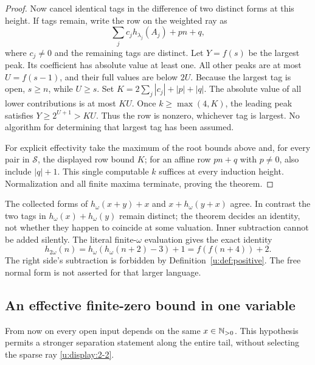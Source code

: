 \begin{proof}
Now cancel identical tags in the difference of two distinct forms at this
height. If tags remain, write the row on the weighted ray as
\begin{equation}
                \sum_j c_j h_{\lambda_j}(A_j)+pn+q,  \label{u:display:2-5}
\end{equation}
where $c_j\ne0$ and the remaining tags are distinct. Let $Y=f(s)$ be the
largest peak. Its coefficient has absolute value at least one. All other
peaks are at most $U=f(s-1)$, and their full values are below $2U$.
Because the largest tag is open, $s\ge n$, while $U\ge s$. Set
$K=2\sum_j|c_j|+|p|+|q|$. The absolute value of all lower contributions
is at most $KU$. Once $k\ge\max(4,K)$, the leading peak satisfies
$Y\ge2^{U+1}>KU$. Thus the row is nonzero, whichever tag is largest.
No algorithm for determining that largest tag has been assumed.

For explicit effectivity take the maximum of the root bounds above and,
for every pair in $\mathcal S$, the displayed row bound $K$; for an affine
row $pn+q$ with $p\ne0$, also include $|q|+1$. This single computable
$k$ suffices at every induction height. Normalization and all finite maxima
terminate, proving the theorem.
\end{proof}

\begin{example}
The collected forms of $h_\omega(x+y)+x$ and $x+h_\omega(y+x)$ agree.
In contrast the two tags in $h_\omega(x)+h_\omega(y)$ remain distinct;
the theorem decides an identity, not whether they happen to coincide at
some valuation. Inner subtraction cannot be added silently. The literal
finite-$\omega$ evaluation gives the exact identity
\[
 h_{2\omega}(n)=h_\omega(h_\omega(n+2)-3)+1
              =f(f(n+4))+2.
\]
The right side's subtraction is forbidden by Definition~\ref{u:def:positive}.
The free normal form is not asserted for that larger language.
\end{example}

\subsection{An effective finite-zero bound in one variable}
From now on every open input depends on the same $x\in\mathbb N_{>0}$.
This hypothesis permits a stronger separation statement along the entire
tail, without selecting the sparse ray \eqref{u:display:2-2}.

